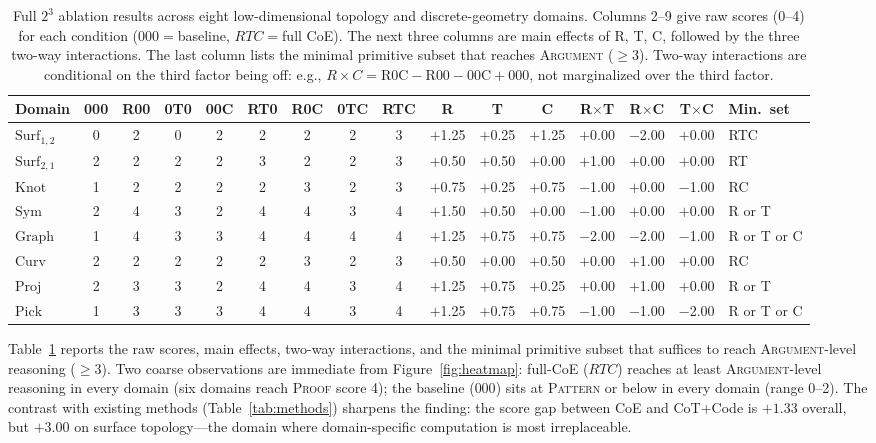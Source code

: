 \documentclass{article}
\begin{document}
\begin{table}[t]
\centering
\caption{Full $2^3$ ablation results across eight low-dimensional topology and
  discrete-geometry domains. Columns 2--9 give raw scores (0--4) for each condition
  ($000{=}$baseline, $RTC{=}$full CoE). The next three columns are main effects of
  R, T, C, followed by the three two-way interactions. The last column lists the
  minimal primitive subset that reaches \textsc{Argument} ($\ge 3$). Two-way
  interactions are conditional on the third factor being off: e.g.,
  $R \times C = \mathrm{R0C} - \mathrm{R00} - \mathrm{00C} + \mathrm{000}$,
  not marginalized over the third factor.}
\label{tab:full-results}
\scriptsize
\setlength{\tabcolsep}{3pt}
\begin{tabular}{lcccccccc|ccc|ccc|l}
\toprule
Domain & 000 & R00 & 0T0 & 00C & RT0 & R0C & 0TC & RTC & R & T & C & R$\times$T & R$\times$C & T$\times$C & Min.~set \\
\midrule
$\mathrm{Surf}_{1,2}$ & 0 & 2 & 0 & 2 & 2 & 2 & 2 & 3 & $+$1.25 & $+$0.25 & $+$1.25 & $+$0.00 & $-$2.00 & $+$0.00 & RTC \\
$\mathrm{Surf}_{2,1}$ & 2 & 2 & 2 & 2 & 3 & 2 & 2 & 3 & $+$0.50 & $+$0.50 & $+$0.00 & $+$1.00 & $+$0.00 & $+$0.00 & RT \\
$\mathrm{Knot}$       & 1 & 2 & 2 & 2 & 2 & 3 & 2 & 3 & $+$0.75 & $+$0.25 & $+$0.75 & $-$1.00 & $+$0.00 & $-$1.00 & RC \\
$\mathrm{Sym}$        & 2 & 4 & 3 & 2 & 4 & 4 & 3 & 4 & $+$1.50 & $+$0.50 & $+$0.00 & $-$1.00 & $+$0.00 & $+$0.00 & R or T \\
$\mathrm{Graph}$      & 1 & 4 & 3 & 3 & 4 & 4 & 4 & 4 & $+$1.25 & $+$0.75 & $+$0.75 & $-$2.00 & $-$2.00 & $-$1.00 & R or T or C \\
$\mathrm{Curv}$       & 2 & 2 & 2 & 2 & 2 & 3 & 2 & 3 & $+$0.50 & $+$0.00 & $+$0.50 & $+$0.00 & $+$1.00 & $+$0.00 & RC \\
$\mathrm{Proj}$       & 2 & 3 & 3 & 2 & 4 & 4 & 3 & 4 & $+$1.25 & $+$0.75 & $+$0.25 & $+$0.00 & $+$1.00 & $+$0.00 & R or T \\
$\mathrm{Pick}$       & 1 & 3 & 3 & 3 & 4 & 4 & 3 & 4 & $+$1.25 & $+$0.75 & $+$0.75 & $-$1.00 & $-$1.00 & $-$2.00 & R or T or C \\
\bottomrule
\end{tabular}
\end{table}

Table~\ref{tab:full-results} reports the raw scores, main effects, two-way interactions,
and the minimal primitive subset that suffices to reach \textsc{Argument}-level
reasoning ($\ge 3$). Two coarse observations are immediate from
Figure~\ref{fig:heatmap}: full-CoE ($RTC$) reaches at least \textsc{Argument}-level
reasoning in every domain (six domains reach \textsc{Proof} score 4); the baseline
($000$) sits at \textsc{Pattern} or below in every domain (range 0--2). The
contrast with existing methods (Table~\ref{tab:methods}) sharpens the finding:
the score gap between CoE and CoT+Code is $+1.33$ overall, but $+3.00$ on
surface topology---the domain where domain-specific computation is most
irreplaceable.
\end{document}
